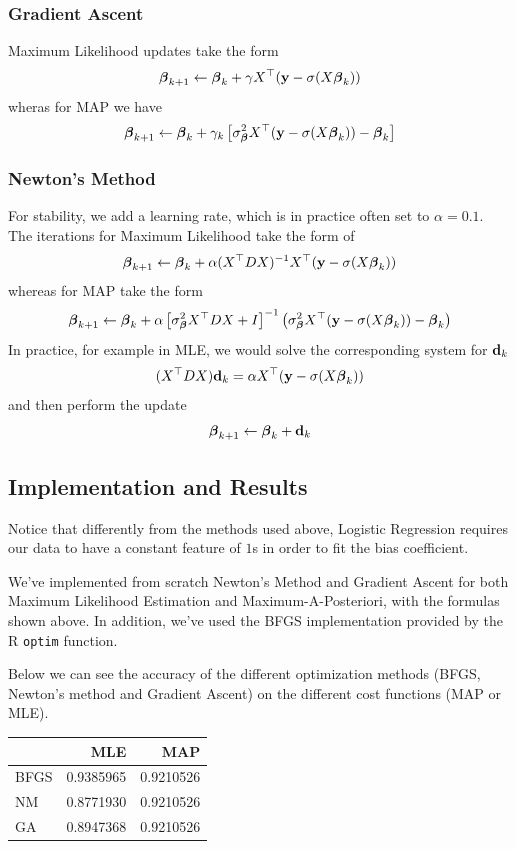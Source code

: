 \documentclass[]{article}
\begin{document}
\subsubsection{Gradient Ascent}\label{gradient-ascent}

Maximum Likelihood updates take the form \[
\boldsymbol{\mathbf{\beta}}_{k+1} \leftarrow \boldsymbol{\mathbf{\beta}}_k + \gamma X^\top(\boldsymbol{\mathbf{y}} - \sigma(X\boldsymbol{\mathbf{\beta}}_k))
\] wheras for MAP we have \[
\boldsymbol{\mathbf{\beta}}_{k+1}\leftarrow  \boldsymbol{\mathbf{\beta}}_k + \gamma_k\left[\sigma_{\boldsymbol{\mathbf{\beta}}}^2X^\top(\boldsymbol{\mathbf{y}} - \sigma(X\boldsymbol{\mathbf{\beta}}_k)) - \boldsymbol{\mathbf{\beta}}_k\right]
\]

\subsubsection{Newton's Method}\label{newtons-method}

For stability, we add a learning rate, which is in practice often set to
\(\alpha=0.1\). The iterations for Maximum Likelihood take the form of
\[
\boldsymbol{\mathbf{\beta}}_{k+1} \leftarrow \boldsymbol{\mathbf{\beta}}_k +  \alpha(X^\top D X)^{-1} X^\top(\boldsymbol{\mathbf{y}} - \sigma(X\boldsymbol{\mathbf{\beta}}_k))
\] whereas for MAP take the form \[
\boldsymbol{\mathbf{\beta}}_{k+1} \leftarrow \boldsymbol{\mathbf{\beta}}_k + \alpha \left[\sigma^2_{\boldsymbol{\mathbf{\beta}}} X^\top D X + I\right]^{-1}\left(\sigma^2_{\boldsymbol{\mathbf{\beta}}} X^\top (\boldsymbol{\mathbf{y}} - \sigma(X\boldsymbol{\mathbf{\beta}}_k)) - \boldsymbol{\mathbf{\beta}}_k\right)
\] In practice, for example in MLE, we would solve the corresponding
system for \(\boldsymbol{\mathbf{d}}_k\) \[
(X^\top D X)\boldsymbol{\mathbf{d}}_k = \alpha X^\top(\boldsymbol{\mathbf{y}} - \sigma(X\boldsymbol{\mathbf{\beta}}_k))
\] and then perform the update \[
\boldsymbol{\mathbf{\beta}}_{k+1}\leftarrow \boldsymbol{\mathbf{\beta}}_k + \boldsymbol{\mathbf{d}}_k
\]

\subsection{Implementation and
Results}\label{implementation-and-results}

Notice that differently from the methods used above, Logistic Regression
requires our data to have a constant feature of \(1\)s in order to fit
the bias coefficient.

We've implemented from scratch Newton's Method and Gradient Ascent for
both Maximum Likelihood Estimation and Maximum-A-Posteriori, with the
formulas shown above. In addition, we've used the BFGS implementation
provided by the R \texttt{optim} function.

Below we can see the accuracy of the different optimization methods
(BFGS, Newton's method and Gradient Ascent) on the different cost
functions (MAP or MLE).

\begin{longtable}[]{@{}lrr@{}}
\toprule
& MLE & MAP\tabularnewline
\midrule
\endhead
BFGS & 0.9385965 & 0.9210526\tabularnewline
NM & 0.8771930 & 0.9210526\tabularnewline
GA & 0.8947368 & 0.9210526\tabularnewline
\bottomrule
\end{longtable}
\end{document}
